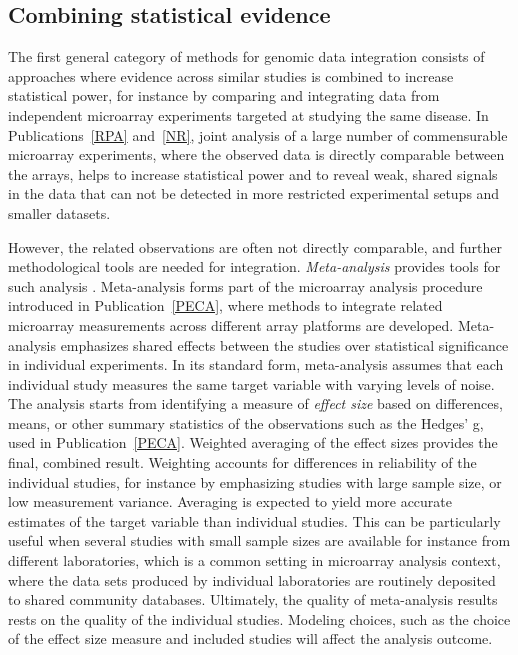 

\subsection{Combining statistical evidence}

The first general category of methods for genomic data integration
consists of approaches where evidence across similar studies is
combined to increase statistical power, for instance by comparing and
integrating data from independent microarray experiments targeted at
studying the same disease. In Publications~\ref{RPA} and~\ref{NR},
joint analysis of a large number of commensurable microarray
experiments, where the observed data is directly comparable between
the arrays, helps to increase statistical power and to reveal weak,
shared signals in the data that can not be detected in more restricted
experimental setups and smaller datasets. 

However, the related observations are often not directly comparable,
and further methodological tools are needed for integration. {\it
Meta-analysis} provides tools for such analysis
\citep{Ramasamy08b}. Meta-analysis forms part of the microarray
analysis procedure introduced in Publication~\ref{PECA}, where methods
to integrate related microarray measurements across different array
platforms are developed. Meta-analysis emphasizes shared effects
between the studies over statistical significance in individual
experiments. In its standard form, meta-analysis assumes that each
individual study measures the same target variable with varying levels
of noise. The analysis starts from identifying a measure of {\it
effect size} based on differences, means, or other summary statistics
of the observations such as the Hedges' g, used in
Publication~\ref{PECA}. Weighted averaging of the effect sizes
provides the final, combined result. Weighting accounts for
differences in reliability of the individual studies, for instance by
emphasizing studies with large sample size, or low measurement
variance. Averaging is expected to yield more accurate estimates of
the target variable than individual studies. This can be particularly
useful when several studies with small sample sizes are available for
instance from different laboratories, which is a common setting in
microarray analysis context, where the data sets produced by
individual laboratories are routinely deposited to shared community
databases. Ultimately, the quality of meta-analysis results rests on
the quality of the individual studies. Modeling choices, such as the
choice of the effect size measure and included studies will affect the
analysis outcome.

